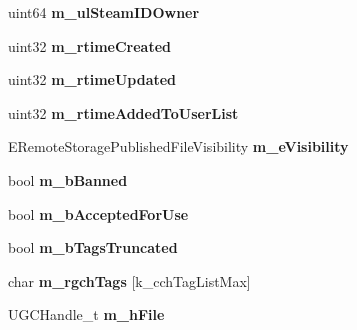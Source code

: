 \begin{DoxyCompactItemize}
\item 
\hypertarget{structSteamUGCDetails__t_a3e20b55373826fcf98333685ffab5316}{}uint64 {\bfseries m\+\_\+ul\+Steam\+I\+D\+Owner}\label{structSteamUGCDetails__t_a3e20b55373826fcf98333685ffab5316}

\item 
\hypertarget{structSteamUGCDetails__t_a84b64074eabe59e3b1792f7d2dba850a}{}uint32 {\bfseries m\+\_\+rtime\+Created}\label{structSteamUGCDetails__t_a84b64074eabe59e3b1792f7d2dba850a}

\item 
\hypertarget{structSteamUGCDetails__t_af04acfa8e0d8c9370493cf0835c56028}{}uint32 {\bfseries m\+\_\+rtime\+Updated}\label{structSteamUGCDetails__t_af04acfa8e0d8c9370493cf0835c56028}

\item 
\hypertarget{structSteamUGCDetails__t_a5606b6c8b17e4318d45b9889915e5f77}{}uint32 {\bfseries m\+\_\+rtime\+Added\+To\+User\+List}\label{structSteamUGCDetails__t_a5606b6c8b17e4318d45b9889915e5f77}

\item 
\hypertarget{structSteamUGCDetails__t_a7d8dd8905fef43a9f06abf6f8a03b2fd}{}E\+Remote\+Storage\+Published\+File\+Visibility {\bfseries m\+\_\+e\+Visibility}\label{structSteamUGCDetails__t_a7d8dd8905fef43a9f06abf6f8a03b2fd}

\item 
\hypertarget{structSteamUGCDetails__t_a5756c6178e03159cdf30405d071dca7f}{}bool {\bfseries m\+\_\+b\+Banned}\label{structSteamUGCDetails__t_a5756c6178e03159cdf30405d071dca7f}

\item 
\hypertarget{structSteamUGCDetails__t_ae2c612ea769f8efb9f4db60b1c542dbb}{}bool {\bfseries m\+\_\+b\+Accepted\+For\+Use}\label{structSteamUGCDetails__t_ae2c612ea769f8efb9f4db60b1c542dbb}

\item 
\hypertarget{structSteamUGCDetails__t_ae02ede384f4b35ee81183537b7524f6e}{}bool {\bfseries m\+\_\+b\+Tags\+Truncated}\label{structSteamUGCDetails__t_ae02ede384f4b35ee81183537b7524f6e}

\item 
\hypertarget{structSteamUGCDetails__t_af9823eb165d633847a8a37be9b1fe729}{}char {\bfseries m\+\_\+rgch\+Tags} \mbox{[}k\+\_\+cch\+Tag\+List\+Max\mbox{]}\label{structSteamUGCDetails__t_af9823eb165d633847a8a37be9b1fe729}

\item 
\hypertarget{structSteamUGCDetails__t_ab30dffe800a3022524f32e89e44e1c33}{}U\+G\+C\+Handle\+\_\+t {\bfseries m\+\_\+h\+File}\label{structSteamUGCDetails__t_ab30dffe800a3022524f32e89e44e1c33}


\end{DoxyCompactItemize}
